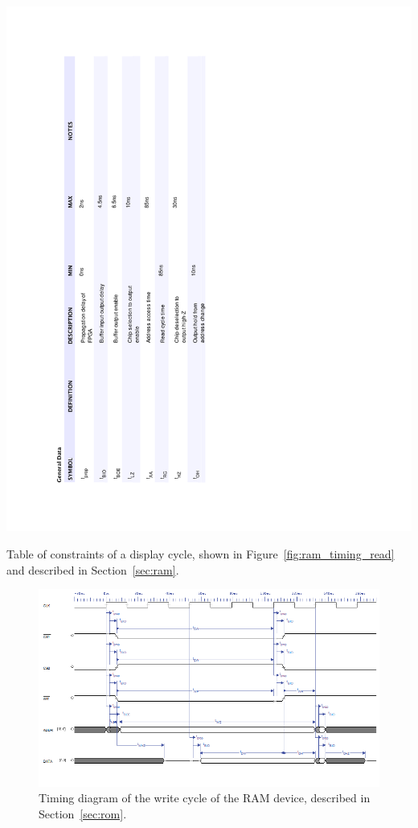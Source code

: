 \documentclass[titlepage]{scrartcl}
\begin{document}
	\begin{table}[h!]
	\vspace{-2cm}
	\centerline{\includegraphics[width=20cm]{img/ram_read_table.pdf}}
		\vspace{0cm}
                	\caption{Table of constraints of a display cycle, shown in Figure~\ref{fig:ram_timing_read} and described in Section~\ref{sec:ram}.}
               	\label{tab:ram_timing_read}
	\end{table}

	\clearpage

	\begin{figure}[h!]
	\vspace{-2cm}
	\centerline{\includegraphics[width=25cm, angle=90, origin=c]{img/ram_write.png}}
		\vspace{1cm}
                	\caption{Timing diagram of the write cycle of the RAM device, described in Section~\ref{sec:rom}.}
               	\label{fig:ram_timing_write}
	\end{figure}
\end{document}
